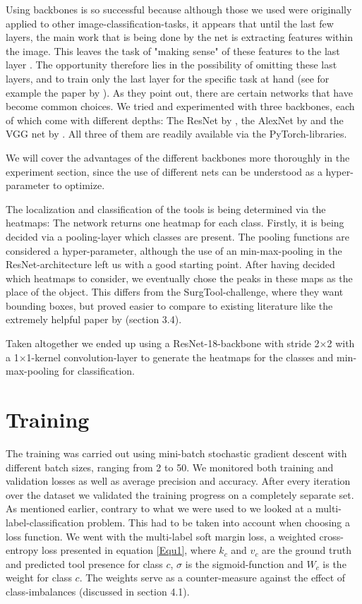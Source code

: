 Using backbones is so successful because although those we used were originally applied to other image-classification-tasks, it appears that until the last few layers, the main work that is being done by the net is extracting features within the image. This leaves the task of "making sense" of these features to the last layer \citep{Vardazaryan}. The opportunity therefore lies in the possibility of omitting these last layers, and to train only the last layer for the specific task at hand (see for example the paper by \cite{https://doi.org/10.48550/arxiv.2206.08016}). As they point out, there are certain networks that have become common choices.
We tried and experimented with three backbones, each of which come with different depths: The ResNet by \cite{https://doi.org/10.48550/arxiv.1512.03385}, the AlexNet by \cite{krizhevsky2017imagenet} and the VGG net by \cite{https://doi.org/10.48550/arxiv.1409.1556}.
All three of them are readily available via the PyTorch-libraries.

We will cover the advantages of the different backbones more thoroughly in the experiment section, since the use of different nets can be understood as a hyper-parameter to optimize.

The localization and classification of the tools is being determined via the heatmaps: The network returns one heatmap for each class. Firstly, it is being decided via a pooling-layer which classes are present. The pooling functions are considered a hyper-parameter, although the use of an min-max-pooling in the ResNet-architecture left us with a good starting point. After having decided which heatmaps to consider, we eventually chose the peaks in these maps as the place of the object. This differs from the SurgTool-challenge, where they want bounding boxes, but proved easier to compare to existing literature like the extremely helpful paper by \cite{Vardazaryan} (section 3.4).

Taken altogether we ended up using a ResNet-18-backbone with stride 2$\times$2 with a 1$\times$1-kernel convolution-layer to generate the heatmaps for the classes and min-max-pooling for classification.

\section{Training}

The training was carried out using mini-batch stochastic gradient descent with different batch sizes, ranging from 2 to 50. We monitored both training and validation losses as well as average precision and accuracy.  After every iteration over the dataset we validated the training progress on a completely separate set.
As mentioned earlier, contrary to what we were used to we looked at a multi-label-classification problem. This had to be taken into account when choosing a loss function. We went with the multi-label soft margin loss, a weighted cross-entropy loss presented in equation \ref{Equ1}, where $k_c$ and $v_c$ are the ground truth and predicted tool presence for class $c$, $\sigma$ is the sigmoid-function and $W_c$ is the weight for class $c$. The weights serve as a counter-measure against the effect of class-imbalances (discussed in section 4.1).


